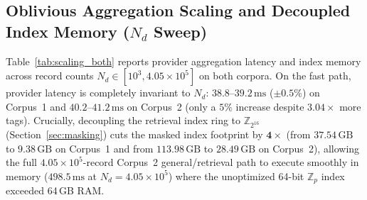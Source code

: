 \documentclass[11pt,a4paper]{article}
\begin{document}
\begin{table}[t!]
\centering
\small
\renewcommand{\arraystretch}{1.14}
\caption{Per-provider full-domain DPF evaluation latency across thread counts and per-provider uplink key size across $n=2$ (GGM tree), $n=3$ (succinct BGI15 tensor-tree, Section~\ref{sec:retrieval_auth}), and explicit $n$-party vector sharing.}
\label{tab:selection}
\end{table}

\subsection{Oblivious Aggregation Scaling and Decoupled Index Memory ($N_d$ Sweep)}
Table~\ref{tab:scaling_both} reports provider aggregation latency and index memory across record counts $N_d \in [10^3, 4.05 \times 10^5]$ on both corpora. On the fast path, provider latency is completely invariant to $N_d$: $38.8\text{--}39.2\,\text{ms}$ ($\pm 0.5\%$) on Corpus~1 and $40.2\text{--}41.2\,\text{ms}$ on Corpus~2 (only a $5\%$ increase despite $3.04\times$ more tags). Crucially, decoupling the retrieval index ring to $\mathbb{Z}_{2^{16}}$ (Section~\ref{sec:masking}) cuts the masked index footprint by $\mathbf{4\times}$ (from $37.54\,\text{GB}$ to $9.38\,\text{GB}$ on Corpus~1 and from $113.98\,\text{GB}$ to $28.49\,\text{GB}$ on Corpus~2), allowing the full $4.05 \times 10^5$-record Corpus~2 general/retrieval path to execute smoothly in memory ($498.5\,\text{ms}$ at $N_d = 4.05\times 10^5$) where the unoptimized 64-bit $\mathbb{Z}_p$ index exceeded 64\,GB RAM.
\end{document}
